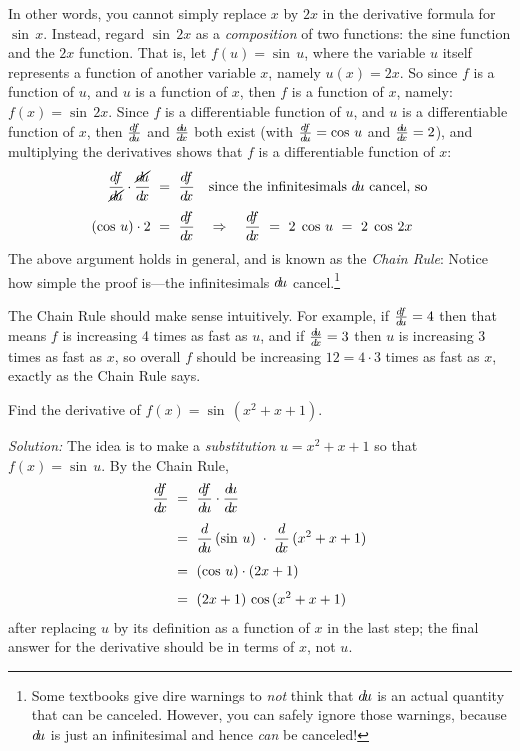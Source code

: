 In other words, you cannot simply replace $x$ by $2x$ in the derivative formula
for $\sin\,x$. Instead, regard $\sin\,2x$ as a \emph{composition} of
two functions: the sine function and the $2x$
function. That is, let $f(u) = \sin\,u$, where the
variable $u$ itself represents a function of another variable $x$, namely
$u(x) = 2x$. So since $f$ is a function of $u$, and $u$ is a function of $x$,
then $f$ is a function of $x$, namely: $f(x) = \sin\,2x$. Since $f$ is a
differentiable function of $u$, and $u$ is a differentiable function of $x$,
then $\frac{d\negmedspace f}{d\!u}$ and $\frac{d\negmedspace u}{d\!x}$ both exist (with $\frac{d\negmedspace f}{d\!u} = \cos\,u$ and $\frac{d\negmedspace u}{d\!x} = 2$),
and multiplying the derivatives shows that $f$ is a differentiable function of
$x$:
\begin{align*}
 \frac{\df}{\cancel{\du}} \cdot \frac{\cancel{\du}}{\dx} ~&=~ \dfdx
  \quad\text{since the infinitesimals $\du$ cancel, so}\\[4pt]
 (\cos\,u) \cdot 2 ~&=~ \dfdx \quad\Rightarrow\quad \dfdx ~=~ 2\;\cos\,u ~=~ 2\;\cos\,2x
\end{align*}
The above argument holds in general, and is known as the
\emph{Chain Rule}:
Notice how simple the proof is---the infinitesimals $d\!u$ cancel.\footnote{Some
textbooks give dire warnings to \emph{not} think that $d\!u$ is an actual
quantity that can be canceled. However, you can safely ignore those warnings,
because $d\!u$ is just an infinitesimal and hence \emph{can} be canceled!}

The Chain Rule should make sense intuitively. For example, if $\frac{d\negmedspace f}{d\!u} = 4$ then
that means $f$ is increasing 4 times as fast as $u$, and if $\frac{d\negmedspace u}{d\!x} = 3$ then $u$
is increasing 3 times as fast as $x$, so overall $f$ should be increasing
$12 = 4 \cdot 3$ times as fast as $x$, exactly as the Chain Rule says.

\begin{exmp}\label{exmp:sinx2pxp1deriv}
 Find the derivative of $f(x) = \sin\,(x^2 + x + 1)$.\vspace{1mm}
 \par\noindent\emph{Solution:} The idea is to make a \emph{substitution}
 $u = x^2 + x + 1$ so that $f(x) = \sin\,u$. By the Chain Rule,
 \begin{align*}
  \dfdx ~&=~ \dfdu \cdot \dudx\\[4pt]
  &=~ \ddu\,(\sin\,u) \;\cdot\; \ddx\,(x^2 + x + 1)\\[4pt]
  &=~ (\cos\,u) \cdot (2x + 1)\\[4pt]
  &=~ (2x + 1)\,\cos\,(x^2 + x + 1)
 \end{align*}
 after replacing $u$ by its definition as a function of $x$ in the last step;
 the final answer for the derivative should be in terms of $x$, not $u$.
\end{exmp}
\divider
\vspace{3mm}


